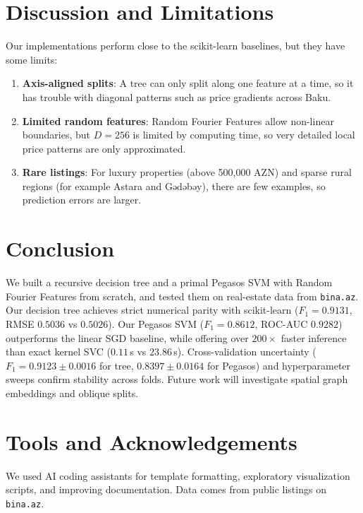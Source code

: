 \documentclass[10pt,twocolumn,a4paper]{article}
\begin{document}
  \section{Discussion and Limitations}
  Our implementations perform close to the scikit-learn baselines, but they have some limits:
  \begin{enumerate}
    \item \textbf{Axis-aligned splits}: A tree can only split along one feature at a time, so it has trouble with diagonal patterns such as price gradients across Baku.
    \item \textbf{Limited random features}: Random Fourier Features allow non-linear boundaries, but $D = 256$ is limited by computing time, so very detailed local price patterns are only approximated.
    \item \textbf{Rare listings}: For luxury properties (above 500,000 AZN) and sparse rural regions (for example Astara and Gədəbəy), there are few examples, so prediction errors are larger.
  \end{enumerate}

  \section{Conclusion}
  We built a recursive decision tree and a primal Pegasos SVM with Random Fourier Features from scratch, and tested them on real-estate data from \texttt{bina.az}. Our decision tree achieves strict numerical parity with scikit-learn ($F_1 = 0.9131$, RMSE $0.5036$ vs $0.5026$). Our Pegasos SVM ($F_1 = 0.8612$, ROC-AUC $0.9282$) outperforms the linear SGD baseline, while offering over $200\times$ faster inference than exact kernel SVC ($0.11$\,s vs $23.86$\,s). Cross-validation uncertainty ($F_1 = 0.9123 \pm 0.0016$ for tree, $0.8397 \pm 0.0164$ for Pegasos) and hyperparameter sweeps confirm stability across folds. Future work will investigate spatial graph embeddings and oblique splits.

  \section*{Tools and Acknowledgements}
  We used AI coding assistants for template formatting, exploratory visualization scripts, and improving documentation. Data comes from public listings on \texttt{bina.az}.
\end{document}

